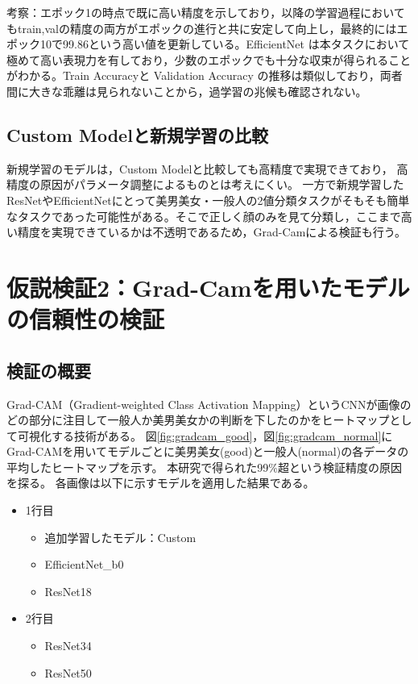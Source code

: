 \documentclass[a4paper,11pt,titlepage]{jsarticle}
\begin{document}
考察：エポック1の時点で既に高い精度を示しており，以降の学習過程においてもtrain,valの精度の両方がエポックの進行と共に安定して向上し，最終的にはエポック10で99.86という高い値を更新している。EfficientNet は本タスクにおいて極めて高い表現力を有しており，少数のエポックでも十分な収束が得られることがわかる。Train Accuracyと Validation Accuracy の推移は類似しており，両者間に大きな乖離は見られないことから，過学習の兆候も確認されない。


\subsection{Custom Modelと新規学習の比較}

新規学習のモデルは，Custom Modelと比較しても高精度で実現できており，
高精度の原因がパラメータ調整によるものとは考えにくい。
一方で新規学習したResNetやEfficientNetにとって美男美女・一般人の2値分類タスクがそもそも簡単なタスクであった可能性がある。そこで正しく顔のみを見て分類し，ここまで高い精度を実現できているかは不透明であるため，Grad-Camによる検証も行う。


\section{仮説検証2：Grad-Camを用いたモデルの信頼性の検証}
\label{label:仮説検証2}
\subsection{検証の概要}
Grad-CAM（Gradient-weighted Class Activation Mapping）というCNNが画像のどの部分に注目して一般人か美男美女かの判断を下したのかをヒートマップとして可視化する技術がある。
図\ref{fig:gradcam_good}，図\ref{fig:gradcam_normal}にGrad-CAMを用いてモデルごとに美男美女(good)と一般人(normal)の各データの平均したヒートマップを示す。
本研究で得られた99\%超という検証精度の原因を探る。
各画像は以下に示すモデルを適用した結果である。
\begin{itemize}
	\item 1行目
	\begin{itemize}
	\item 追加学習したモデル：Custom
	\item EfficientNet\_b0
	\item ResNet18
	\end{itemize}
	\item 2行目
	\begin{itemize}
	\item ResNet34
	\item ResNet50
	\end{itemize}
\end{itemize}
\end{document}
